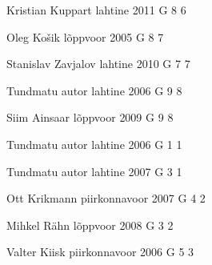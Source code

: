 \documentclass[11pt]{article}
\begin{document}
{Kristian Kuppart} %
{lahtine} %
{2011} %
{G 8} %
{6} %
{

\ifEngHint
\fi
}

{Oleg Košik} %
{lõppvoor} %
{2005} %
{G 8} %
{7} %
{

\ifEngHint
\fi
}

{Stanislav Zavjalov} %
{lahtine} %
{2010} %
{G 7} %
{7} %
{

\ifEngHint
\fi
}

{Tundmatu autor} %
{lahtine} %
{2006} %
{G 9} %
{8} %
{

\ifEngHint
\fi
}

{Siim Ainsaar} %
{lõppvoor} %
{2009} %
{G 9} %
{8} %
{

\ifEngHint
\fi
}

{Tundmatu autor} %
{lahtine} %
{2006} %
{G 1} %
{1} %
{

\ifEngHint
\fi
}

{Tundmatu autor} %
{lahtine} %
{2007} %
{G 3} %
{1} %
{

\ifEngHint
\fi
}

{Ott Krikmann} %
{piirkonnavoor} %
{2007} %
{G 4} %
{2} %
{

\ifEngHint
\fi
}

{Mihkel Rähn} %
{lõppvoor} %
{2008} %
{G 3} %
{2} %
{

\ifEngHint
\fi
}

{Valter Kiisk} %
{piirkonnavoor} %
{2006} %
{G 5} %
{3} %
{

\ifEngHint
\fi
}
\end{document}

